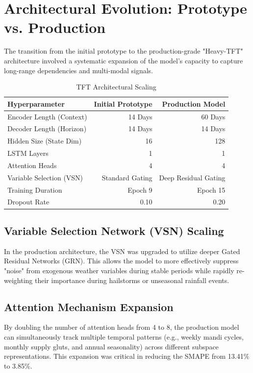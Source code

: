 \documentclass[conference]{IEEEtran}
\begin{document}
\section{Architectural Evolution: Prototype vs. Production}

The transition from the initial prototype to the production-grade "Heavy-TFT" architecture involved a systematic expansion of the model's capacity to capture long-range dependencies and multi-modal signals.

\begin{table}[htbp]
\caption{TFT Architectural Scaling}
\centering
\begin{tabular}{lrr}
\toprule
\textbf{Hyperparameter} & \textbf{Initial Prototype} & \textbf{Production Model} \\
\midrule
Encoder Length (Context) & 14 Days & 60 Days \\
Decoder Length (Horizon) & 14 Days & 14 Days \\
Hidden Size (State Dim) & 16 & 128 \\
LSTM Layers & 1 & 1 \\
Attention Heads & 4 & 4 \\
Variable Selection (VSN) & Standard Gating & Deep Residual Gating \\
Training Duration & Epoch 9 & Epoch 15 \\
Dropout Rate & 0.10 & 0.20 \\
\bottomrule
\end{tabular}
\end{table}

\subsection{Variable Selection Network (VSN) Scaling}
In the production architecture, the VSN was upgraded to utilize deeper Gated Residual Networks (GRN). This allows the model to more effectively suppress "noise" from exogenous weather variables during stable periods while rapidly re-weighting their importance during hailstorms or unseasonal rainfall events.

\subsection{Attention Mechanism Expansion}
By doubling the number of attention heads from 4 to 8, the production model can simultaneously track multiple temporal patterns (e.g., weekly mandi cycles, monthly supply gluts, and annual seasonality) across different subspace representations. This expansion was critical in reducing the SMAPE from 13.41\% to 3.85\%.
\end{document}
